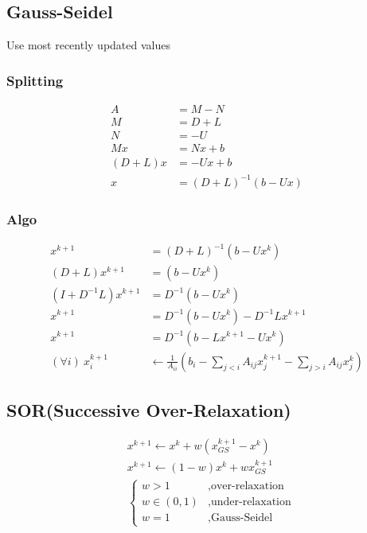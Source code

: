 \documentclass[8pt,letter]{article}
\begin{document}
\begin{multicols*}{2}
    \subsection{Gauss-Seidel}
    Use most recently updated values
    \subsubsection{Splitting}
    \begin{align*}
      A &= M-N\\
      M &= D + L\\
      N &= -U\\
      Mx &= Nx +b\\
      (D+L)x &= -Ux + b\\
      x &=  (D+L)^{-1}(b -Ux)
    \end{align*}

    \vfill\null
    \columnbreak
        
    \subsubsection{Algo}
    \begin{align*}
      x^{k+1} &=  (D+L)^{-1}(b -Ux^k)\\
      (D+L) x^{k+1} &= (b -Ux^k)\\
      (I+D^{-1}L) x^{k+1} &= D^{-1} (b -Ux^k)\\
      x^{k+1} &= D^{-1} (b -Ux^k) - D^{-1}L x^{k+1}\\
      x^{k+1} &= D^{-1} (b - L x^{k+1} - Ux^k)\\
      (\forall i)\ x_i^{k+1} & \leftarrow \frac{1}{A_{ii}} \left(b_i - \sum_{j<i} A_{ij} x_j^{k+1} - \sum_{j>i} A_{ij} x_j^k\right)
    \end{align*}
    
    \subsection{SOR(Successive Over-Relaxation)}
    \begin{align*}
      & x^{k+1} \leftarrow x^k + w (x_{GS}^{k+1} - x^k)\\
      & x^{k+1} \leftarrow (1-w) x^k + w x_{GS}^{k+1}\\
      &\begin {cases}
        w > 1 &, \text{over-relaxation}\\
        w \in (0,1) &, \text{under-relaxation}\\
        w = 1 &, \text{Gauss-Seidel}
      \end {cases}
    \end{align*}


\end{multicols*}
\end{document}
